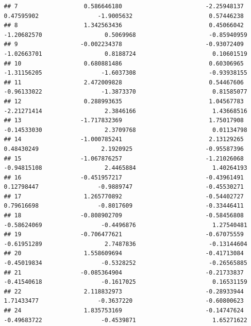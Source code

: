 \documentclass[
]{article}
\begin{document}
\begin{verbatim}
## 7                   0.586646180                        -2.25948137                    0.47595902                 -1.9005632                      0.57446238
## 8                   1.342563436                         0.45066042                   -1.20682570                  0.5069968                     -0.85940959
## 9                  -0.002234378                        -0.93072409                   -1.02663701                  0.8188724                      0.10601519
## 10                  0.680881486                         0.60306965                   -1.31156205                 -1.6037308                     -0.93938155
## 11                  2.472009828                         0.54467606                   -0.96133022                 -1.3873370                      0.81585077
## 12                  0.288993635                         1.04567783                   -2.21271414                  2.3846166                      1.43668516
## 13                 -1.717832369                         1.75017908                   -0.14533030                  2.3709768                      0.01134798
## 14                 -1.000785241                         2.13129265                    0.48430249                  2.1920925                     -0.95587396
## 15                 -1.067876257                        -1.21026068                   -0.94815108                  2.4465884                      1.40264193
## 16                 -0.451957217                        -0.43961491                    0.12798447                 -0.9889747                     -0.45530271
## 17                  1.265770892                        -0.54402727                    0.79616698                 -0.8017609                     -0.33446411
## 18                 -0.808902709                        -0.58456808                   -0.58624069                 -0.4496876                      1.27540481
## 19                 -0.706477621                        -0.67075559                   -0.61951289                  2.7487836                     -0.13144604
## 20                  1.558609694                        -0.41713084                   -0.45019834                 -0.5328252                     -0.26565885
## 21                 -0.085364904                        -0.21733837                   -0.41540618                 -0.1617025                      0.16531159
## 22                  2.118832973                        -0.28933944                    1.71433477                 -0.3637220                     -0.60800623
## 24                  1.835753169                        -0.14747624                   -0.49683722                 -0.4539871                      1.65271622

\end{verbatim}
\end{document}
